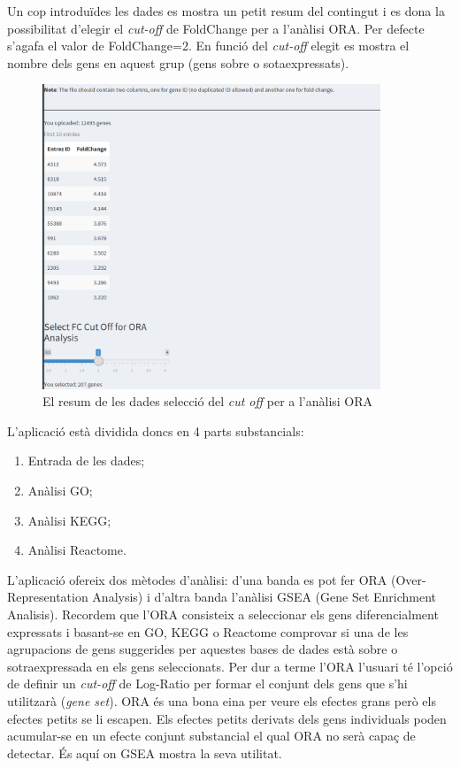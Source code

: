 \documentclass[]{article}
\begin{document}
Un cop introduïdes les dades es mostra  un petit resum del contingut i es dona la possibilitat d'elegir el \textit{cut-off} de FoldChange per a l'anàlisi ORA. Per defecte s'agafa el valor de FoldChange=2. En funció del \textit{cut-off} elegit es mostra el nombre dels gens en aquest grup (gens sobre o sotaexpressats).

\begin{figure}[h!]
\caption{El resum de les dades selecció del \textit{cut off} per a l'anàlisi ORA}
\centering
\includegraphics[width=0.9\textwidth]{App_F1b}
\end{figure}


L'aplicació està dividida doncs en 4 parts substancials:

\begin{enumerate}
\item Entrada de les dades;
\item Anàlisi GO;
\item Anàlisi KEGG;
\item Anàlisi Reactome.
\end{enumerate}


L'aplicació ofereix dos mètodes d'anàlisi: d'una banda es pot fer ORA (Over-Representation Analysis) i d'altra banda l'anàlisi GSEA (Gene Set Enrichment Analisis). Recordem que l'ORA consisteix a seleccionar els gens diferencialment expressats i basant-se en GO, KEGG o Reactome comprovar si una de les agrupacions de gens suggerides per aquestes bases de dades està sobre o sotraexpressada en els gens seleccionats. Per dur a terme l'ORA l'usuari té l’opció de definir un \textit{cut-off} de Log-Ratio per formar el conjunt dels gens que s'hi utilitzarà (\textit{gene set}). ORA és una bona eina per veure els efectes grans però els efectes petits se li escapen. Els efectes petits derivats dels gens individuals poden acumular-se en un efecte conjunt substancial el qual ORA no serà capaç de detectar. És aquí on GSEA mostra la seva utilitat. 
\end{document}

